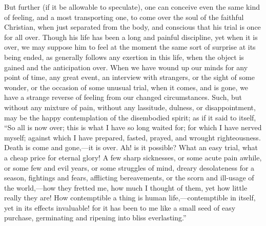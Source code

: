 But further (if it be allowable to speculate), one can conceive
even the same kind of feeling, and a most transporting one, to come
over the soul of the faithful Christian, when just separated from the
body, and conscious that his trial is once for all over. Though his
life has been a long and painful discipline, yet when it is over, we
may suppose him to feel at the moment the same sort of surprise at its
being ended, as generally follows any exertion in this life, when the
object is gained and the anticipation over. When we have wound up our
minds for any point of time, any great event, an interview with
strangers, or the sight of some wonder, or the occasion of some
unusual trial, when it comes, and is gone, we have a strange reverse
of feeling from our changed circumstances. Such, but without any mixture of pain, without any lassitude, dulness, or disappointment,
may be the happy contemplation of the disembodied spirit; as if it
said to itself, ``So all is now over; this is what I have so long
waited for; for which I have nerved myself; against which I have
prepared, fasted, prayed, and wrought righteousness. Death is come and
gone,—it is over. Ah! is it possible? What an easy trial, what a
cheap price for eternal glory! A few sharp sicknesses, or some acute
pain awhile, or some few and evil years, or some struggles of mind,
dreary desolateness for a season, fightings and fears, afflicting
bereavements, or the scorn and ill-usage of the world,—how they
fretted me, how much I thought of them, yet how little really they
are! How contemptible a thing is human life,—contemptible in itself,
yet in its effects invaluable! for it has been to me like a small seed
of easy purchase, germinating and ripening into bliss
everlasting.''

